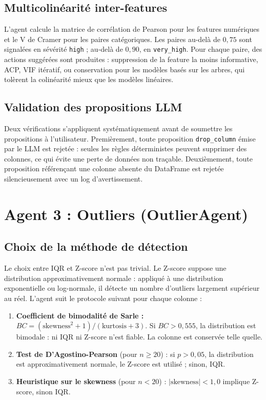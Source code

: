 \documentclass[12pt,a4paper]{article}
\begin{document}
\subsection{Multicolinéarité inter-features}

L'agent calcule la matrice de corrélation de Pearson pour les features numériques et
le V de Cramer pour les paires catégoriques. Les paires au-delà de $0{,}75$ sont
signalées en sévérité \texttt{high} ; au-delà de $0{,}90$, en \texttt{very\_high}.
Pour chaque paire, des actions suggérées sont produites : suppression de la feature
la moins informative, ACP, VIF itératif, ou conservation pour les modèles basés
sur les arbres, qui tolèrent la colinéarité mieux que les modèles linéaires.

\subsection{Validation des propositions LLM}

Deux vérifications s'appliquent systématiquement avant de soumettre les propositions à
l'utilisateur. Premièrement, toute proposition \texttt{drop\_column} émise par le LLM
est rejetée : seules les règles déterministes peuvent supprimer des colonnes, ce qui
évite une perte de données non traçable. Deuxièmement, toute proposition référençant
une colonne absente du DataFrame est rejetée silencieusement avec un log d'avertissement.

\section{Agent 3 : Outliers (OutlierAgent)}

\subsection{Choix de la méthode de détection}

Le choix entre IQR et Z-score n'est pas trivial. Le Z-score suppose une distribution
approximativement normale : appliqué à une distribution exponentielle ou log-normale,
il détecte un nombre d'outliers largement supérieur au réel. L'agent suit le protocole
suivant pour chaque colonne :

\begin{enumerate}
  \item \textbf{Coefficient de bimodalité de Sarle :} $BC = (\text{skewness}^2 + 1) / (\text{kurtosis} + 3)$.
  Si $BC > 0{,}555$, la distribution est bimodale : ni IQR ni Z-score n'est fiable.
  La colonne est conservée telle quelle.
  \item \textbf{Test de D'Agostino-Pearson} (pour $n \geq 20$) : si $p > 0{,}05$, la
  distribution est approximativement normale, le Z-score est utilisé ; sinon, IQR.
  \item \textbf{Heuristique sur le skewness} (pour $n < 20$) : $|\text{skewness}| < 1{,}0$
  implique Z-score, sinon IQR.
\end{enumerate}
\end{document}
